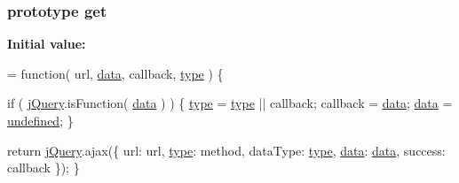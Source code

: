 \subsubsection[{get}]{ {\bf prototype} get}\label{jquery-1_810_82-vsdoc_8js_a904e08d31e9d836b29247ea5e274ae83}
{\bfseries Initial value\+:}
\begin{DoxyCode}
= \textcolor{keyword}{function}( url, \hyperlink{jquery-1_810_82-vsdoc_8js_a609407b3456fdc3c5671a9fc4a226ff7}{data}, callback, \hyperlink{jquery-1_810_82-vsdoc_8js_a3940565e83a9bfd10d95ffd27536da91}{type} ) \{


        
        \textcolor{keywordflow}{if} ( \hyperlink{jquery-1_810_82-vsdoc_8js_add5237586d970a38a81f990e8eb28c6c}{jQuery}.isFunction( \hyperlink{jquery-1_810_82-vsdoc_8js_a609407b3456fdc3c5671a9fc4a226ff7}{data} ) ) \{
            \hyperlink{jquery-1_810_82-vsdoc_8js_a3940565e83a9bfd10d95ffd27536da91}{type} = \hyperlink{jquery-1_810_82-vsdoc_8js_a3940565e83a9bfd10d95ffd27536da91}{type} || callback;
            callback = \hyperlink{jquery-1_810_82-vsdoc_8js_a609407b3456fdc3c5671a9fc4a226ff7}{data};
            \hyperlink{jquery-1_810_82-vsdoc_8js_a609407b3456fdc3c5671a9fc4a226ff7}{data} = \hyperlink{jquery-1_810_82-vsdoc_8js_a08113a236cc18d2a9d5ce27e638012be}{undefined};
        \}

        \textcolor{keywordflow}{return} \hyperlink{jquery-1_810_82-vsdoc_8js_add5237586d970a38a81f990e8eb28c6c}{jQuery}.ajax(\{
            url: url,
            \hyperlink{jquery-1_810_82-vsdoc_8js_a3940565e83a9bfd10d95ffd27536da91}{type}: method,
            dataType: \hyperlink{jquery-1_810_82-vsdoc_8js_a3940565e83a9bfd10d95ffd27536da91}{type},
            \hyperlink{jquery-1_810_82-vsdoc_8js_a609407b3456fdc3c5671a9fc4a226ff7}{data}: \hyperlink{jquery-1_810_82-vsdoc_8js_a609407b3456fdc3c5671a9fc4a226ff7}{data},
            success: callback
        \});
    \}
\end{DoxyCode}
\hypertarget{jquery-1_810_82-vsdoc_8js_a27b6f13a844bac0871a73628443197b5}{}
